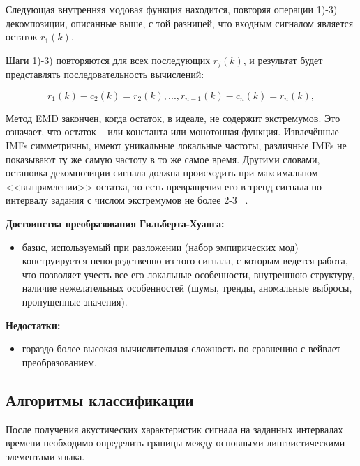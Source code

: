 \documentclass[utf8x, 14pt, oneside, a4paper]{article}
\begin{document}
\begin{enumerate}
		Следующая внутренняя модовая функция находится, повторяя операции 1)-3) декомпозиции, описанные выше, с той разницей, что входным сигналом является остаток $r_1(k)$.
		
		Шаги 1)-3) повторяются для всех последующих $r_j(k)$, и результат будет представлять последовательность вычислений:
		
		\begin{equation}
			r_1(k)-c_2(k)=r_2(k),...,r_{n-1}(k)-c_n(k)=r_n(k),
		\end{equation}
	
		Метод EMD закончен, когда остаток, в идеале, не содержит экстремумов. Это означает, что остаток – или константа или монотонная функция. Извлечённые IMFs симметричны, имеют уникальные локальные частоты, различные IMFs не показывают ту же самую частоту в то же самое время. Другими словами, остановка декомпозиции сигнала должна происходить при максимальном <<выпрямлении>> остатка, то есть превращения его в тренд сигнала по интервалу задания с числом экстремумов не более 2-3 ~\cite{magistr}.
		
	\end{enumerate}

	\begin{flushleft}
		{\bf Достоинства преобразования Гильберта-Хуанга:}
	\end{flushleft}
	\begin{itemize}
		\item базис, используемый при разложении (набор эмпирических мод) конструируется непосредственно из того сигнала, с которым ведется работа, что позволяет учесть все его локальные особенности, внутреннюю структуру, наличие нежелательных особенностей (шумы, тренды, аномальные выбросы, пропущенные значения).
	\end{itemize}
	
	\begin{flushleft}
		{\bf Недостатки:}
	\end{flushleft}
	\begin{itemize}
		\item гораздо более высокая вычислительная сложность по сравнению с вейвлет-преобразованием.
	\end{itemize}
	
	\subsection{Алгоритмы классификации}
	
	После получения акустических характеристик сигнала на заданных интервалах времени необходимо определить границы между основными лингвистическими элементами языка.
	
\end{document}
